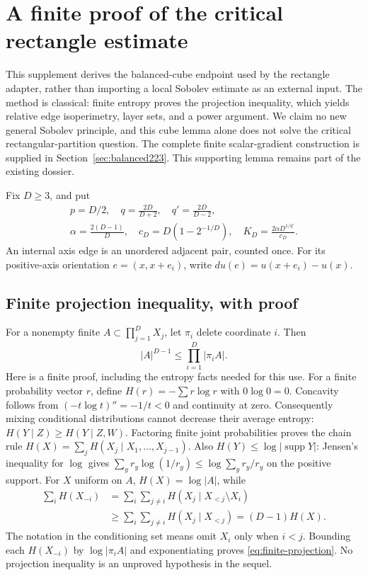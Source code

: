 \section{A finite proof of the critical rectangle estimate}
\label{sec:self-contained-box-sobolev}
This supplement derives the balanced-cube endpoint used by the rectangle
adapter, rather than importing a local Sobolev estimate as an external input.
The method is classical: finite entropy proves the projection inequality,
which yields relative edge isoperimetry, layer sets, and a power argument.
We claim no new general Sobolev principle, and this cube lemma alone does
not solve the critical rectangular-partition question. The complete finite
scalar-gradient construction is supplied in Section~\ref{sec:balanced223}.
This supporting lemma remains part of the existing dossier.

Fix $D\geq3$, and put
\[
 \begin{gathered}
 p=D/2,\quad q=\frac{2D}{D+2},\quad q'=\frac{2D}{D-2},\\
 \alpha=\frac{2(D-1)}D,\quad c_D=D(1-2^{-1/D}),\quad
 K_D=\frac{2\alpha D^{1/q'}}{c_D}.
 \end{gathered}
\]
An internal axis edge is an unordered adjacent pair, counted once. For its
positive-axis orientation $e=(x,x+e_i)$, write $du(e)=u(x+e_i)-u(x)$.

\subsection{Finite projection inequality, with proof}
For a nonempty finite $A\subset\prod_{j=1}^D X_j$, let $\pi_i$ delete
coordinate $i$. Then
\begin{equation}\label{eq:finite-projection}
 |A|^{D-1}\leq\prod_{i=1}^D|\pi_i A|.
\end{equation}
Here is a finite proof, including the entropy facts needed for this use.
For a finite probability vector $r$, define $H(r)=-\sum r\log r$ with
$0\log0=0$. Concavity follows from $(-t\log t)''=-1/t<0$ and continuity at
zero. Consequently mixing conditional distributions cannot decrease their
average entropy: $H(Y\mid Z)\geq H(Y\mid Z,W)$. Factoring finite joint
probabilities proves the chain rule
$H(X)=\sum_jH(X_j\mid X_1,\ldots,X_{j-1})$.
Also $H(Y)\leq\log|\operatorname{supp}Y|$: Jensen's inequality for $\log$
gives $\sum_y r_y\log(1/r_y)\leq\log\sum_y r_y/r_y$ on the positive support.
For $X$ uniform on $A$, $H(X)=\log|A|$, while
\[
 \begin{split}
 \sum_i H(X_{-i})
 &=\sum_i\sum_{j\ne i}H(X_j\mid X_{<j}\setminus X_i)\\
 &\geq\sum_i\sum_{j\ne i}H(X_j\mid X_{<j})
 =(D-1)H(X).
 \end{split}
\]
The notation in the conditioning set means omit $X_i$ only when $i<j$.
Bounding each $H(X_{-i})$ by $\log|\pi_i A|$ and exponentiating proves
\eqref{eq:finite-projection}. No projection inequality is an unproved
hypothesis in the sequel.

